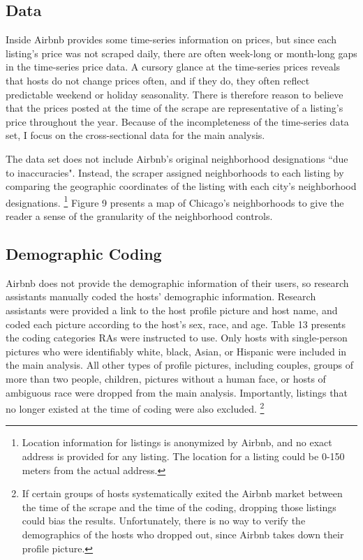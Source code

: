 \subsection*{Data}

Inside Airbnb provides some time-series information on prices, but since each listing's price was not scraped daily, there are often week-long or month-long gaps in the time-series price data. A cursory glance at the time-series prices reveals that hosts do not change prices often, and if they do, they often reflect predictable weekend or holiday seasonality. There is therefore reason to believe that the prices posted at the time of the scrape are representative of a listing's price throughout the year. Because of the incompleteness of the time-series data set, I focus on the cross-sectional data for the main analysis.  

The data set does not include Airbnb's original neighborhood designations ``due to inaccuracies". Instead, the scraper assigned neighborhoods to each listing by comparing the geographic coordinates of the listing with each city's neighborhood designations.%
	\footnote{Location information for listings is anonymized by Airbnb, and no exact address is provided for any listing. The location for a listing could be 0-150 meters from the actual address.} 
Figure 9 presents a map of Chicago's neighborhoods to give the reader a sense of the granularity of the neighborhood controls. 

\subsection*{Demographic Coding}

Airbnb does not provide the demographic information of their users, so research assistants manually coded the hosts' demographic information. Research assistants were provided a link to the host profile picture and host name, and coded each picture according to the host's sex, race, and age. Table 13 presents the coding categories RAs were instructed to use. Only hosts with single-person pictures who were identifiably white, black, Asian, or Hispanic were included in the main analysis. All other types of profile pictures, including couples, groups of more than two people, children, pictures without a human face, or hosts of ambiguous race were dropped from the main analysis. Importantly, listings that no longer existed at the time of coding were also excluded.%
	\footnote{If certain groups of hosts systematically exited the Airbnb market between the time of the scrape and the time of the coding, dropping those listings could bias the results. Unfortunately, there is no way to verify the demographics of the hosts who dropped out, since Airbnb takes down their profile picture.}

